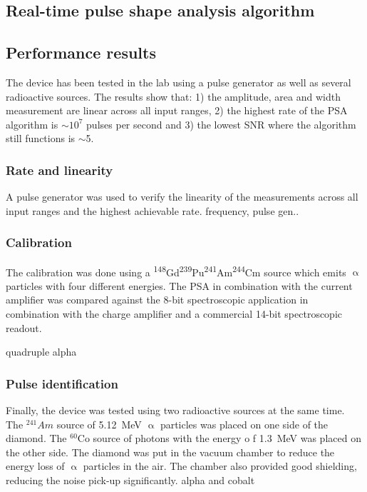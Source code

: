 \documentclass[12pt]{mytustyle}  %
\begin{document}


\subsection{Real-time pulse shape analysis algorithm}





\subsection{Performance results}
The device has been tested in the lab using a pulse generator as well as several radioactive sources. The results show that: 1) the amplitude, area and width measurement are linear across all input ranges, 2) the highest rate of the PSA algorithm is $\sim10^7$ pulses per second and 3) the lowest SNR where the algorithm still functions is $\sim$5.  

\subsubsection{Rate and linearity}
A pulse generator was used to verify the linearity of the measurements across all input ranges and the highest achievable rate. 
frequency, pulse gen..

\subsubsection{Calibration}
The calibration was done using a \textsuperscript{148}Gd\textsuperscript{239}Pu\textsuperscript{241}Am\textsuperscript{244}Cm source which emits $\upalpha$ particles with four different energies. The PSA in combination with the current amplifier was compared against the 8-bit spectroscopic application in combination with the charge amplifier and a commercial 14-bit spectroscopic readout.

quadruple alpha

\subsubsection{Pulse identification}
Finally, the device was tested using two radioactive sources at the same time. The $^{241}Am$ source of 5.12~MeV $\upalpha$ particles was placed on one side of the diamond. The $^{60}$Co source of photons with the energy o f 1.3~MeV was placed on the other side. The diamond was put in the vacuum chamber to reduce the energy loss of $\upalpha$ particles in the air. The chamber also provided good shielding, reducing the noise pick-up significantly. 
alpha and cobalt
\end{document}
